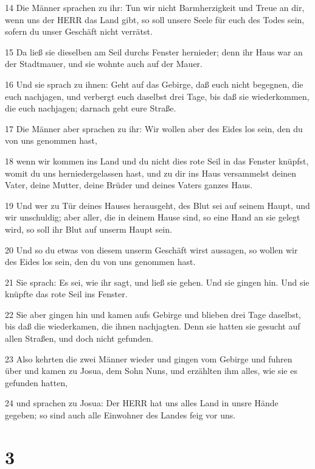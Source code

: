 \par 14 Die Männer sprachen zu ihr: Tun wir nicht Barmherzigkeit und Treue an dir, wenn uns der HERR das Land gibt, so soll unsere Seele für euch des Todes sein, sofern du unser Geschäft nicht verrätst.
\par 15 Da ließ sie dieselben am Seil durchs Fenster hernieder; denn ihr Haus war an der Stadtmauer, und sie wohnte auch auf der Mauer.
\par 16 Und sie sprach zu ihnen: Geht auf das Gebirge, daß euch nicht begegnen, die euch nachjagen, und verbergt euch daselbst drei Tage, bis daß sie wiederkommen, die euch nachjagen; darnach geht eure Straße.
\par 17 Die Männer aber sprachen zu ihr: Wir wollen aber des Eides los sein, den du von uns genommen hast,
\par 18 wenn wir kommen ins Land und du nicht dies rote Seil in das Fenster knüpfst, womit du uns herniedergelassen hast, und zu dir ins Haus versammelst deinen Vater, deine Mutter, deine Brüder und deines Vaters ganzes Haus.
\par 19 Und wer zu Tür deines Hauses herausgeht, des Blut sei auf seinem Haupt, und wir unschuldig; aber aller, die in deinem Hause sind, so eine Hand an sie gelegt wird, so soll ihr Blut auf unserm Haupt sein.
\par 20 Und so du etwas von diesem unserm Geschäft wirst aussagen, so wollen wir des Eides los sein, den du von uns genommen hast.
\par 21 Sie sprach: Es sei, wie ihr sagt, und ließ sie gehen. Und sie gingen hin. Und sie knüpfte das rote Seil ins Fenster.
\par 22 Sie aber gingen hin und kamen aufs Gebirge und blieben drei Tage daselbst, bis daß die wiederkamen, die ihnen nachjagten. Denn sie hatten sie gesucht auf allen Straßen, und doch nicht gefunden.
\par 23 Also kehrten die zwei Männer wieder und gingen vom Gebirge und fuhren über und kamen zu Josua, dem Sohn Nuns, und erzählten ihm alles, wie sie es gefunden hatten,
\par 24 und sprachen zu Josua: Der HERR hat uns alles Land in unsre Hände gegeben; so sind auch alle Einwohner des Landes feig vor uns.

\chapter{3}

